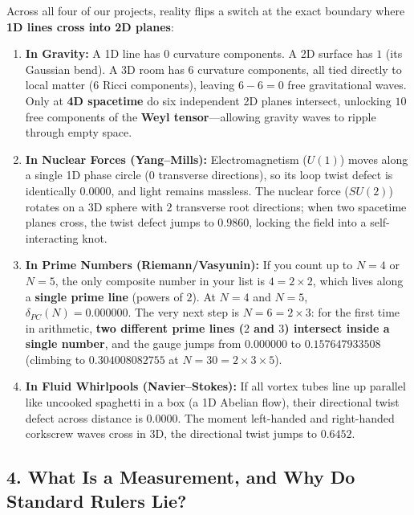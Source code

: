 \documentclass[11pt,a4paper]{article}
\begin{document}
Across all four of our projects, reality flips a switch at the exact boundary where \textbf{1D lines cross into 2D planes}:
\begin{enumerate}
  \item \textbf{In Gravity:} A 1D line has $0$ curvature components. A 2D surface has $1$ (its Gaussian bend). A 3D room has $6$ curvature components, all tied directly to local matter ($6$ Ricci components), leaving $6-6=0$ free gravitational waves. Only at \textbf{4D spacetime} do six independent 2D planes intersect, unlocking $10$ free components of the \textbf{Weyl tensor}---allowing gravity waves to ripple through empty space.
  \item \textbf{In Nuclear Forces (Yang--Mills):} Electromagnetism ($U(1)$) moves along a single 1D phase circle ($0$ transverse directions), so its loop twist defect is identically $0.0000$, and light remains massless. The nuclear force ($SU(2)$) rotates on a 3D sphere with $2$ transverse root directions; when two spacetime planes cross, the twist defect jumps to $0.9860$, locking the field into a self-interacting knot.
  \item \textbf{In Prime Numbers (Riemann/Vasyunin):} If you count up to $N=4$ or $N=5$, the only composite number in your list is $4 = 2\times 2$, which lives along a \textbf{single prime line} (powers of $2$). At $N=4$ and $N=5$, $\delta_{PC}(N) = 0.000000$. The very next step is $N = 6 = 2 \times 3$: for the first time in arithmetic, \textbf{two different prime lines ($2$ and $3$) intersect inside a single number}, and the gauge jumps from $0.000000$ to $0.157647933508$ (climbing to $0.304008082755$ at $N=30=2\times 3\times 5$).
  \item \textbf{In Fluid Whirlpools (Navier--Stokes):} If all vortex tubes line up parallel like uncooked spaghetti in a box (a 1D Abelian flow), their directional twist defect across distance is $0.0000$. The moment left-handed and right-handed corkscrew waves cross in 3D, the directional twist jumps to $0.6452$.
\end{enumerate}

\subsection*{4. What Is a Measurement, and Why Do Standard Rulers Lie?}
\end{document}
